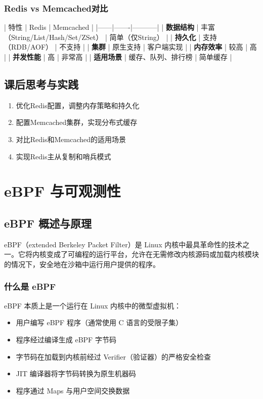 \documentclass[12pt,UTF8]{ctexbook}
\begin{document}
\subsection*{Redis vs Memcached对比}

| 特性 | Redis | Memcached |
|------|-------|-----------|
| \textbf{数据结构} | 丰富（String/List/Hash/Set/ZSet） | 简单（仅String） |
| \textbf{持久化} | 支持（RDB/AOF） | 不支持 |
| \textbf{集群} | 原生支持 | 客户端实现 |
| \textbf{内存效率} | 较高 | 高 |
| \textbf{并发性能} | 高 | 非常高 |
| \textbf{适用场景} | 缓存、队列、排行榜 | 简单缓存 |

\section{课后思考与实践}
\label{sec:other-tuning-practice}
\begin{enumerate}
    \item 优化Redis配置，调整内存策略和持久化
    \item 配置Memcached集群，实现分布式缓存
    \item 对比Redis和Memcached的适用场景
    \item 实现Redis主从复制和哨兵模式
\end{enumerate}

\chapter{eBPF 与可观测性}
\label{chap:ebpf}

\section{eBPF 概述与原理}
\label{sec:ebpf-overview}

eBPF（extended Berkeley Packet Filter）是 Linux 内核中最具革命性的技术之一。它将内核变成了可编程的运行平台，允许在无需修改内核源码或加载内核模块的情况下，安全地在沙箱中运行用户提供的程序。

\subsection*{什么是 eBPF}

eBPF 本质上是一个运行在 Linux 内核中的微型虚拟机：
\begin{itemize}
    \item 用户编写 eBPF 程序（通常使用 C 语言的受限子集）
    \item 程序经过编译生成 eBPF 字节码
    \item 字节码在加载到内核前经过 Verifier（验证器）的严格安全检查
    \item JIT 编译器将字节码转换为原生机器码
    \item 程序通过 Maps 与用户空间交换数据
\end{itemize}
\end{document}

